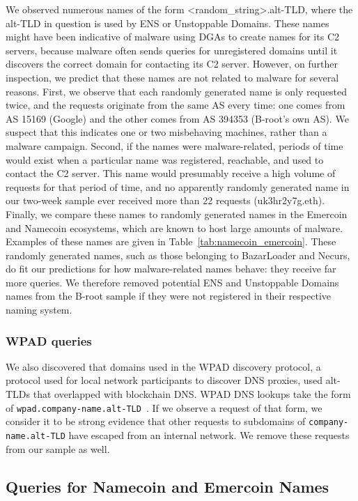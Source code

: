 We observed numerous names of the form <random\_string>.alt-TLD, where the 
alt-TLD in question is used by ENS or Unstoppable Domains. These names 
might have been indicative of malware using DGAs to create names for its C2 
servers, because malware often sends queries for unregistered domains until it 
discovers the correct domain for contacting its C2 server. However, on further 
inspection, we predict 
that these names are not related to malware for several 
reasons. First, we observe that each randomly generated name is only requested 
twice, and the requests originate from the same AS every time: one comes from 
AS 15169 (Google) and the other comes from AS 394353 (B-root's own AS). We 
suspect that this indicates one or two misbehaving machines, rather than a 
malware campaign. Second, if the names were malware-related, periods 
of time would exist when a particular name was registered, reachable, and used 
to contact the C2 server. This name would presumably receive a high volume of 
requests for that period of time, and no apparently randomly generated name in 
our two-week sample ever received more than 22 requests (uk3hr2y7g.eth). 
Finally, we compare these names to randomly generated names in the Emercoin and 
Namecoin ecosystems, which are known to host large amounts of malware. Examples 
of these names are given in Table~\ref{tab:namecoin_emercoin}. These randomly 
generated names, such as those belonging to BazarLoader and Necurs, do fit our 
predictions for how malware-related names behave: they receive far more 
queries. We therefore removed potential ENS and Unstoppable Domains names from 
the B-root sample if they were not registered in their respective naming system.

\subsubsection{WPAD queries}

We also discovered that domains used in the WPAD discovery protocol, a protocol 
used for local network participants to discover DNS proxies, used alt-TLDs that 
overlapped with blockchain DNS. WPAD DNS lookups take the form of 
\texttt{wpad.company-name.alt-TLD}~\cite{chen_wpad_2016}. If we observe a 
request of that form, we consider it to be strong evidence that other requests 
to subdomains of \texttt{company-name.alt-TLD} have escaped from an internal 
network. We remove these requests from our sample as well. 


\subsection{Queries for Namecoin and Emercoin Names}

